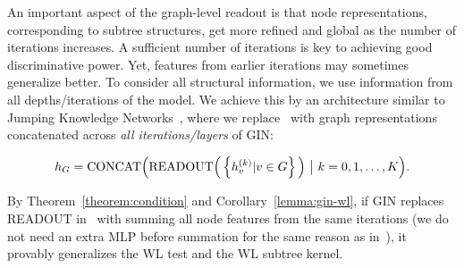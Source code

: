 An important aspect of the graph-level readout is that node representations, corresponding to subtree structures, get more refined and global as the number of iterations increases. A sufficient number of iterations is key to achieving good discriminative power. Yet, features from earlier iterations may sometimes generalize better. To consider all structural information, we use information from all depths/iterations of the model. We achieve this by an architecture similar to Jumping Knowledge Networks~\citep{xu2018representation}, where we replace~ with graph representations concatenated across \emph{all iterations/layers} of GIN:
\vspace{-0.2in}

\begin{align} 
\label{eq:GIN-readout}
h_{G} = {\rm CONCAT} \Big(  {\rm READOUT}\Big( \left\lbrace h_v^{(k)} | v \in G \right\rbrace \Big)  \  \big\vert \  k = 0, 1, \ldots, K \Big).
\end{align}

\vspace{-0.05in}


By Theorem~\ref{theorem:condition} and Corollary~\ref{lemma:gin-wl}, if GIN replaces READOUT in~ with summing all node features from the same iterations (we do not need an extra MLP before summation for the same reason as in~), it provably generalizes the WL test and the WL subtree kernel. 


 
